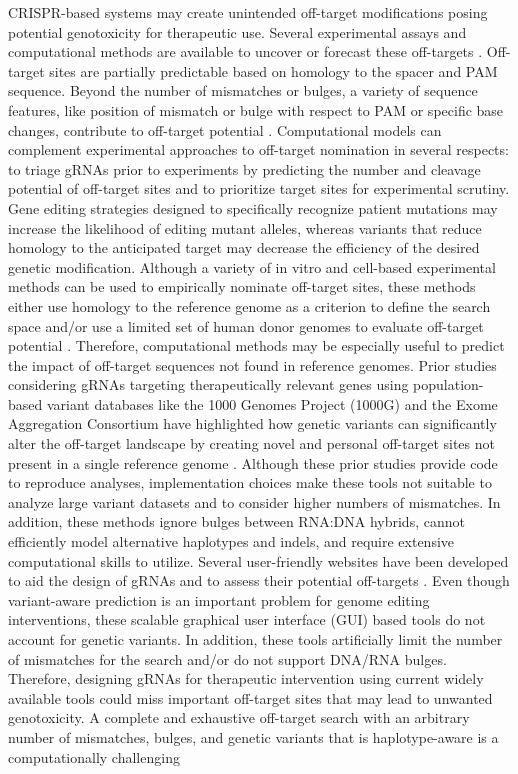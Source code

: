 \documentclass[a4paper, titlepage, openright]{book}
\begin{document}
CRISPR-based systems may create unintended off-target modifications posing potential genotoxicity for therapeutic use. Several experimental assays and computational methods are available to uncover or forecast these off-targets \citep{clement2020technologies}. Off-target sites are partially predictable based on homology to the spacer and PAM sequence. Beyond the number of mismatches or bulges, a variety of sequence features, like position of mismatch or bulge with respect to PAM or specific base changes, contribute to off-target potential \citep{clement2020technologies,bao2021tools,hsu2013dna,doench2016optimized}. Computational models can complement experimental approaches to off-target nomination in several respects: to triage gRNAs prior to experiments by predicting the number and cleavage potential of off-target sites and to prioritize target sites for experimental scrutiny.  Gene editing strategies designed to specifically recognize patient mutations may increase the likelihood of editing mutant alleles, whereas variants that reduce homology to the anticipated target may decrease the efficiency of the desired genetic modification. Although a variety of in vitro and cell-based experimental methods can be used to empirically nominate off-target sites, these methods either use homology to the reference genome as a criterion to define the search space and/or use a limited set of human donor genomes to evaluate off-target potential \citep{bao2021tools,chaudhari2020evaluation}. Therefore, computational methods may be especially useful to predict the impact of off-target sequences not found in reference genomes. Prior studies considering gRNAs targeting therapeutically relevant genes using population-based variant databases like the 1000 Genomes Project (1000G) \citep{siva20081000} and the Exome Aggregation Consortium \citep{karczewski2017exac} have highlighted how genetic variants can significantly alter the off-target landscape by creating novel and personal off-target sites not present in a single reference genome \citep{lessard2017human,scott2017implications}. Although these prior studies provide code to reproduce analyses, implementation choices make these tools not suitable to analyze large variant datasets and to consider higher numbers of mismatches. In addition, these methods ignore bulges between RNA:DNA hybrids, cannot efficiently model alternative haplotypes and indels, and require extensive computational skills to utilize. Several user-friendly websites have been developed to aid the design of gRNAs and to assess their potential off-targets \citep{concordet2018crispor,listgarten2018prediction,labun2019chopchop,park2015cas}. Even though variant-aware prediction is an important problem for genome editing interventions, these scalable graphical user interface (GUI) based tools do not account for genetic variants. In addition, these tools artificially limit the number of mismatches for the search and/or do not support DNA/RNA bulges. Therefore, designing gRNAs for therapeutic intervention using current widely available tools could miss important off-target sites that may lead to unwanted genotoxicity. A complete and exhaustive off-target search with an arbitrary number of mismatches, bulges, and genetic variants that is haplotype-aware is a computationally challenging 
\end{document}
